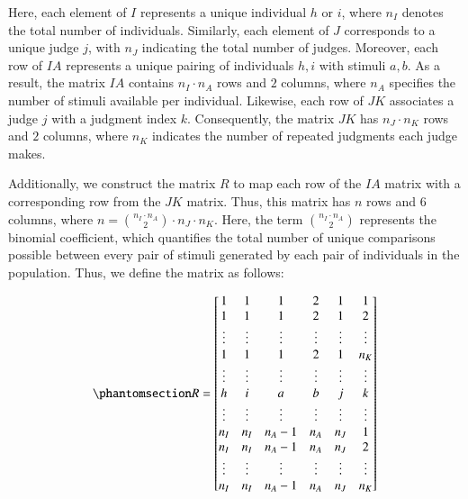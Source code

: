 \documentclass[
  authoryear,
  review,
  1p]{elsarticle}
\begin{document}
Here, each element of \(I\) represents a unique individual \(h\) or
\(i\), where \(n_{I}\) denotes the total number of individuals.
Similarly, each element of \(J\) corresponds to a unique judge \(j\),
with \(n_{J}\) indicating the total number of judges. Moreover, each row
of \(IA\) represents a unique pairing of individuals \(h, i\) with
stimuli \(a, b\). As a result, the matrix \(IA\) contains
\(n_{I} \cdot n_{A}\) rows and \(2\) columns, where \(n_{A}\) specifies
the number of stimuli available per individual. Likewise, each row of
\(JK\) associates a judge \(j\) with a judgment index \(k\).
Consequently, the matrix \(JK\) has \(n_{J} \cdot n_{K}\) rows and \(2\)
columns, where \(n_{K}\) indicates the number of repeated judgments each
judge makes.

Additionally, we construct the matrix \(R\) to map each row of the
\(IA\) matrix with a corresponding row from the \(JK\) matrix. Thus,
this matrix has \(n\) rows and \(6\) columns, where
\(n = {n_{I} \cdot n_{A} \choose 2} \cdot n_{J} \cdot n_{K}\). Here, the
term \({n_{I} \cdot n_{A} \choose 2}\) represents the binomial
coefficient, which quantifies the total number of unique comparisons
possible between every pair of stimuli generated by each pair of
individuals in the population. Thus, we define the matrix as follows:

\begin{equation}\phantomsection\label{eq-mat12}{
R = \begin{bmatrix}
1 & 1 & 1 & 2 & 1 & 1 \\
1 & 1 & 1 & 2 & 1 & 2 \\
\vdots & \vdots & \vdots & \vdots & \vdots & \vdots\\
1 & 1 & 1 & 2 & 1 & n_{K} \\
\vdots & \vdots & \vdots & \vdots & \vdots & \vdots\\
h & i & a & b & j & k \\
\vdots & \vdots & \vdots & \vdots & \vdots & \vdots\\
n_{I} & n_{I} & n_{A}-1 & n_{A} & n_{J} & 1 \\
n_{I} & n_{I} & n_{A}-1 & n_{A} & n_{J} & 2 \\
\vdots & \vdots & \vdots & \vdots & \vdots & \vdots\\
n_{I} & n_{I} & n_{A}-1 & n_{A} & n_{J} & n_{K} \\
\end{bmatrix}
}\end{equation}
\end{document}

